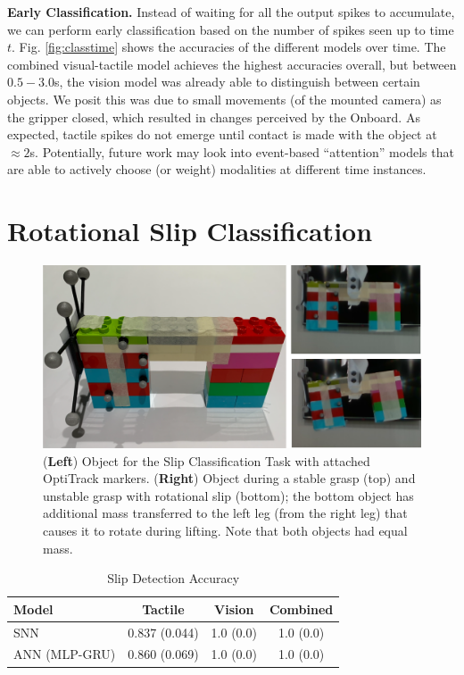 \documentclass[fyp]{socreport}
\begin{document}
\noindent\textbf{Early Classification.} Instead of waiting for all the output
spikes to accumulate, we can perform early classification based on the number of
spikes seen up to time $t$. Fig. \ref{fig:classtime} shows the accuracies of the
different models over time. The combined visual-tactile model achieves the
highest accuracies overall, but between $0.5-3.0$s, the vision model was already
able to distinguish between certain objects. We posit this was due to small
movements (of the mounted camera) as the gripper closed, which resulted in
changes perceived by the Onboard. As expected, tactile spikes do not emerge
until contact is made with the object at $\approx 2$s. Potentially, future work
may look into event-based ``attention'' models that are able to actively choose
(or weight) modalities at different time instances.

\section{Rotational Slip Classification}
\label{sec:slip}

\begin{figure}
\centering
\includegraphics[width=0.95\columnwidth]{images/robotsetup/objects_exp2_small.png}
\caption{(\textbf{Left}) Object for the Slip Classification Task with attached
  OptiTrack markers. (\textbf{Right}) Object during a stable grasp (top) and
  unstable grasp with rotational slip (bottom); the bottom object has additional
  mass transferred to the left leg (from the right leg) that causes it to rotate
  during lifting. Note that both objects had equal
  mass.
}
\label{img:slips}
\end{figure}

\begin{table}
\centering
\caption{Slip Detection Accuracy}
\label{tbl:sdacc}
\begin{tabular}{l|ccc}
 \hline
 \hline
  \textbf{Model} & \textbf{Tactile} & \textbf{Vision} & \textbf{Combined} \\
  \hline
 SNN & 0.837 (0.044)  & 1.0 (0.0) & 1.0 (0.0) \\
 \hline
 ANN (MLP-GRU) & 0.860 (0.069) & 1.0 (0.0)  & 1.0 (0.0) \\
 \hline
 \hline
\end{tabular}
\end{table}
\end{document}
